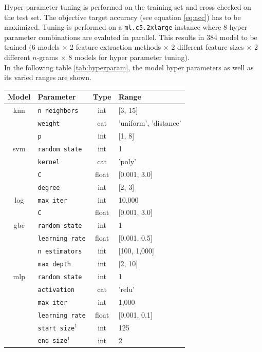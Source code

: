 \documentclass[a4paper,12pt,nottoc]{article}
\begin{document}
Hyper parameter tuning is performed on the training set and cross checked on the test set. The objective target accuracy (see equation \ref{eq:acc}) has to be maximized. Tuning is performed on a \texttt{ml.c5.2xlarge} instance where 8 hyper parameter combinations are evaluted in parallel. This results in 384 model to be trained (6 models $\times$ 2 feature extraction methods $\times$ 2 different feature sizes $\times$ 2 different $n$-grams $\times$ 8 models for hyper parameter tuning).\\

\noindent In the following table \ref{tab:hyperparam}, the model hyper parameters as well as its varied ranges are shown. 

\begin{table}[h]
\begin{center}
\begin{tabular}{| c | l | c | l |}
\hline
Model & Parameter & Type & Range \\
\hline
knn \cite{bib:knn} & \texttt{n neighbors} & int & [3, 15] \\
& \texttt{weight} & cat & 'uniform', 'distance'\\
& \texttt{p} & int & [1, 8] \\
\hline
svm \cite{bib:knn} & \texttt{random state} & int & 1 \\
& \texttt{kernel} & cat & 'poly' \\
& \texttt{C} & float & [0.001, 3.0] \\
& \texttt{degree} & int & [2, 3] \\
\hline
log \cite{bib:log} & \texttt{max iter} & int & 10,000 \\
& \texttt{C} & float & [0.001, 3.0] \\
\hline
gbc \cite{bib:gbc} & \texttt{random state} & int & 1	 \\
& \texttt{learning rate} & float & [0.001, 0.5] \\
& \texttt{n estimators} & int & [100, 1,000] \\
& \texttt{max depth} & int & [2, 10] \\
\hline
mlp \cite{bib:mlp} & \texttt{random state} & int & 1 \\
& \texttt{activation} & cat & 'relu' \\
& \texttt{max iter} & int & 1,000 \\
& \texttt{learning rate} & float & [0.001, 0.1] \\
& \texttt{start size}$^\textrm{1}$ & int & 125 \\
& \texttt{end size}$^\textrm{1}$ & int & 2 \\

\end{tabular}
\end{center}
\end{table}
\end{document}
